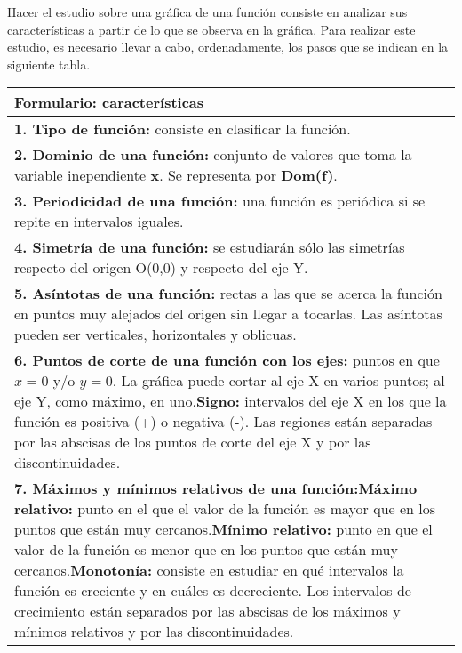 Hacer el estudio sobre una gráfica de una función consiste en analizar sus características a partir de lo que se observa en la gráfica. Para realizar este estudio, es necesario llevar a cabo, ordenadamente, los pasos que se indican en la siguiente tabla.\\
\begin{table}[]
	
	\begin{tabular}{|p{5cm}|}
		\hline
		\textbf{Formulario: características}\\ \hline
		\textbf{1. Tipo de función:} consiste en clasificar la función. \\ \hline
		\textbf{2. Dominio de una función:} conjunto de valores que toma la variable inependiente \textbf{x}. Se representa por \textbf{Dom(f)}.\\ \hline
		\textbf{3. Periodicidad de una función:} una función es periódica si se repite en intervalos iguales.\\ \hline
		\textbf{4. Simetría de una función:} se estudiarán sólo las simetrías respecto del origen O(0,0) y respecto del eje Y.\\ \hline
		\textbf{5. Asíntotas de una función:} rectas a las que se acerca la función en puntos muy alejados del origen sin llegar a tocarlas. Las asíntotas pueden ser verticales, horizontales y oblicuas. \\ \hline
		\textbf{6. Puntos de corte de una función con los ejes:} puntos en que $x=0$ y/o $y=0$. La gráfica puede cortar al eje X en varios puntos; al eje Y, como máximo, en uno.\newline \textbf{Signo:} intervalos del eje X en los que la función es positiva (+) o negativa (-). Las regiones están separadas por las abscisas de los puntos de corte del eje X y por las discontinuidades. \\ \hline
		\textbf{7. Máximos y mínimos relativos de una función:}\newline \textbf{Máximo relativo:} punto en el que el valor de la función es mayor que en los puntos que están muy cercanos.\newline \textbf{Mínimo relativo: } punto en que el valor de la función es menor que en los puntos que están muy cercanos.\newline \textbf{Monotonía: } consiste en estudiar en qué intervalos la función es creciente y en cuáles es decreciente. Los intervalos de crecimiento están separados por las abscisas de los máximos y mínimos relativos y por las discontinuidades. \\ \hline

\end{tabular}
\end{table}
